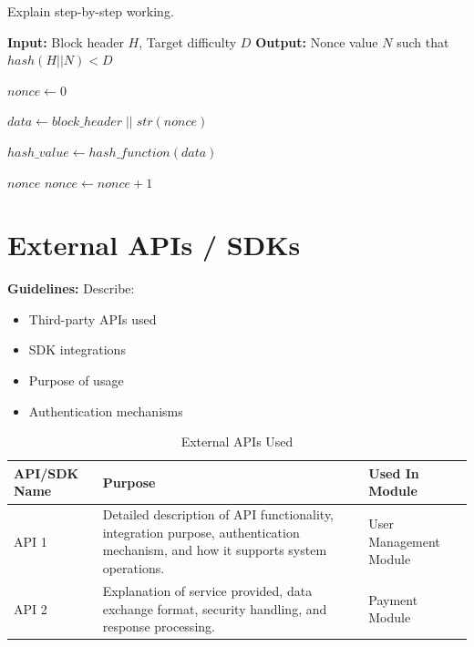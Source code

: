 Explain step-by-step working.
\begin{algorithm}[H]
\caption{Proof of Work Consensus}
\begin{algorithmic}[1]

\State \textbf{Input:} Block header $H$, Target difficulty $D$
\State \textbf{Output:} Nonce value $N$ such that $hash(H || N) < D$

    \State $nonce \gets 0$
    
    
        \State {}
        \State $data \gets block\_header \; || \; str(nonce)$
        
        \State {}
        \State $hash\_value \gets hash\_function(data)$
        
        \State {}
            \State \Return $nonce$ 
        \Else
            \State $nonce \gets nonce + 1$ 
        \EndIf
        
    \EndWhile
    
\EndFunction

\end{algorithmic}
\end{algorithm}
 

\section{External APIs / SDKs}

\textbf{Guidelines:}
Describe:
\begin{itemize}
    \item Third-party APIs used
    \item SDK integrations
    \item Purpose of usage
    \item Authentication mechanisms
\end{itemize}

\begin{table}[h]
\centering
\caption{External APIs Used}
\begin{tabularx}{\textwidth}{|p{3cm}|X|p{4cm}|}
\hline
\textbf{API/SDK Name} & \textbf{Purpose} & \textbf{Used In Module} \\
\hline
API 1 & Detailed description of API functionality, integration purpose, authentication mechanism, and how it supports system operations. & User Management Module \\
\hline
API 2 & Explanation of service provided, data exchange format, security handling, and response processing. & Payment Module \\
\hline
\end{tabularx}
\end{table}

